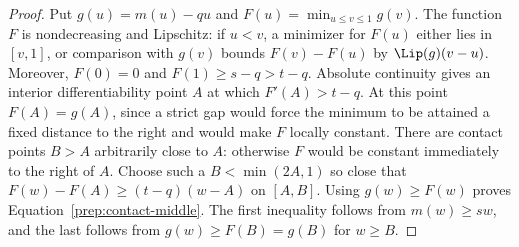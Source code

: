 \begin{proof}
Put $g(u)=m(u)-qu$ and $F(u)=\min_{u\le v\le1}g(v)$.
The function $F$ is nondecreasing and Lipschitz: if $u<v$, a minimizer
for $F(u)$ either lies in $[v,1]$, or comparison with $g(v)$ bounds
$F(v)-F(u)$ by $\Lip(g)(v-u)$. Moreover, $F(0)=0$ and
$F(1)\ge s-q>t-q$. Absolute continuity gives an interior
differentiability point $A$ at which $F'(A)>t-q$.
At this point $F(A)=g(A)$, since a strict gap would force the minimum
to be attained a fixed distance to the right and would make $F$ locally
constant. There are contact points $B>A$ arbitrarily close to $A$:
otherwise $F$ would be constant immediately to the right of $A$.
Choose such a $B<\min(2A,1)$ so close that
$F(w)-F(A)\ge(t-q)(w-A)$ on $[A,B]$.
Using $g(w)\ge F(w)$ proves Equation~\eqref{prep:contact-middle}.
The first inequality follows from $m(w)\ge sw$, and the last follows
from $g(w)\ge F(B)=g(B)$ for $w\ge B$.
\end{proof}
